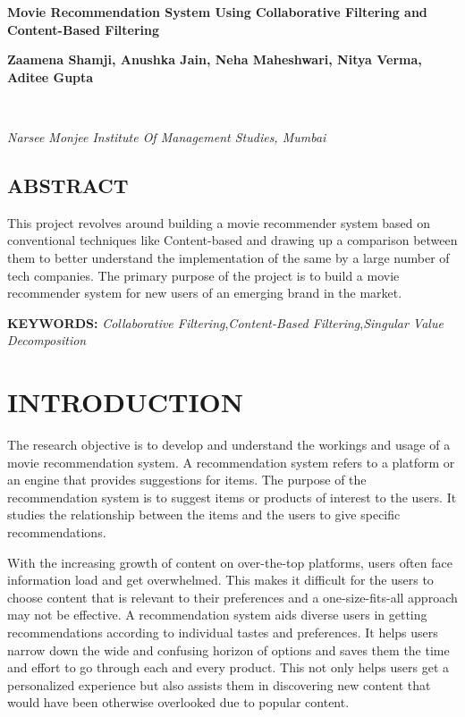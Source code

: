 \documentclass[a4paper,10pt]{article}
\begin{document}
\noindent 
\begin{center}
\textbf{{\Large Movie Recommendation System Using Collaborative Filtering and Content-Based Filtering}} \\
\end{center}

\noindent 
\begin{center}
\textbf{ Zaamena Shamji, Anushka Jain, Neha Maheshwari, Nitya Verma, Aditee Gupta } 
\end{center}\\[-0.5cm]

\begin{center}
\textit{Narsee Monjee Institute Of Management Studies, Mumbai}\\
\end{center}


\noindent 
\begin{center}
    \subsection*{ABSTRACT}
    This project revolves around building a movie recommender system based on conventional techniques like Content-based and drawing up a comparison between them to better understand the implementation of the same by a large number of tech companies. The primary purpose of the project is to build a movie recommender system for new users of an emerging brand in the market.

\end{center}

\noindent 
\textbf{KEYWORDS:} \textit{Collaborative Filtering},\textit{Content-Based Filtering},\textit{Singular Value Decomposition}


\section{INTRODUCTION}

The research objective is to develop and understand the workings and usage of a movie recommendation system. A recommendation system refers to a platform or an engine that provides suggestions for items. The purpose of the recommendation system is to suggest items or products of interest to the users. It studies the relationship between the items and the users to give specific recommendations.

With the increasing growth of content on over-the-top platforms, users often face information load and get overwhelmed. This makes it difficult for the users to choose content that is relevant to their preferences and a one-size-fits-all approach may not be effective. A recommendation system aids diverse users in getting recommendations according to individual tastes and preferences. It helps users narrow down the wide and confusing horizon of options and saves them the time and effort to go through each and every product. This not only helps users get a personalized experience but also assists them in discovering new content that would have been otherwise overlooked due to popular content.
\end{document}
